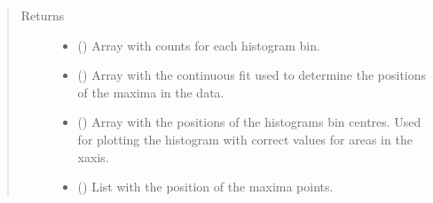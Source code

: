 \documentclass[letterpaper,10pt,english]{sphinxmanual}
\begin{document}
\begin{fulllineitems}
\begin{quote}
\begin{description}
\begin{itemize}
\end{itemize}

\item[{Returns}] \leavevmode
\sphinxAtStartPar
\begin{itemize}
\item {} 
\sphinxAtStartPar
{} () \textendash{} Array with counts for each histogram bin.

\item {} 
\sphinxAtStartPar
{} () \textendash{} Array with the continuous fit used to determine
the positions of the maxima in the data.

\item {} 
\sphinxAtStartPar
{} () \textendash{} Array with the positions of the histograms bin centres.
Used for plotting the histogram with correct values
for areas in the x\sphinxhyphen{}axis.

\item {} 
\sphinxAtStartPar
{} () \textendash{} List with the position of the maxima points.

\end{itemize}


\end{description}\end{quote}

\end{fulllineitems}

\end{document}
